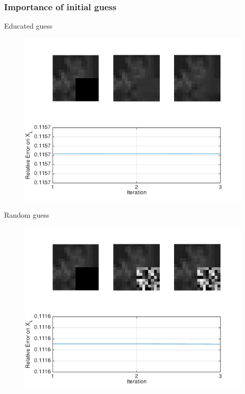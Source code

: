 \documentclass{beamer}
\begin{document}
\begin{frame}
\frametitle{Importance of initial guess}
\begin{minipage}{0.48 \linewidth}
\centering
Educated guess
\begin{figure}
\includegraphics[width=1.1\linewidth]{XInitConvergence}
\end{figure}
\end{minipage}
\begin{minipage}{0.48 \linewidth}
\centering
Random guess
\begin{figure}
\includegraphics[width=1.1\linewidth]{XInitRandom}
\end{figure}
\end{minipage}
\end{frame}
\end{document}

